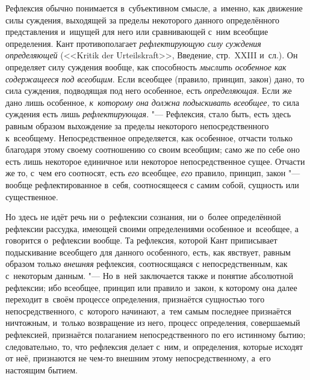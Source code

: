 \subsubremark{}

Рефлексия обычно понимается в~субъективном смысле, а~именно, как движение
силы суждения, выходящей за пределы некоторого данного определённого
представления и~ищущей для него или сравнивающей с~ним всеобщие
определения. Кант противополагает {\em рефлектирующую
силу суждения определяющей} (<<Kritik der Urteils\-kraft>>, Введение,
стр.~XXIII и~сл.).
Он определяет силу суждения вообще, как способность
{\em мыслить особенное как содержащееся под всеобщим}.
Если всеобщее (правило, принцип, закон) дано, то сила суждения, подводящая
под него особенное, есть {\em определяющая}. Если же
дано лишь особенное, {\em к~которому она должна
подыскивать всеобщее,} то сила суждения есть лишь
{\em рефлектирующая}.
"--- Рефлексия, стало быть, есть здесь равным образом выхождение за пределы
некоторого непосредственного к~всеобщему. Непосредственное определяется,
как особенное, отчасти только благодаря этому своему соотношению со своим
всеобщим; само же по себе оно есть лишь некоторое единичное или некоторое
непосредственное сущее. Отчасти же то, с~чем его соотносят, есть
{\em его} всеобщее, {\em его}
правило, принцип, закон "--- вообще рефлектированное в~себя, соотносящееся с
самим собой, сущность или существенное.

Но здесь не идёт речь ни о~рефлексии сознания, ни о~более определённой
рефлексии рассудка, имеющей своими определениями особенное и~всеобщее, а
говорится о~рефлексии вообще. Та рефлексия, которой Кант приписывает
подыскивание всеобщего для данного особенного, есть, как явствует, равным
образом только {\em внешняя} рефлексия, соотносящаяся с
непосредственным, как с~некоторым данным. "--- Но в~ней заключается также и
понятие абсолютной рефлексии; ибо всеобщее, принцип или правило и~закон, к
которому она далее переходит в~своём процессе определения, признаётся
сущностью того непосредственного, с~которого начинают, а~тем самым
последнее признаётся ничтожным, и~только возвращение из него, процесс
определения, совершаемый рефлексией, признаётся полаганием
непосредственного по его истинному бытию; следовательно, то, что рефлексия
делает с~ним, и~определения, которые исходят от неё, признаются не чем-то
внешним этому непосредственному, а~его настоящим бытием.


